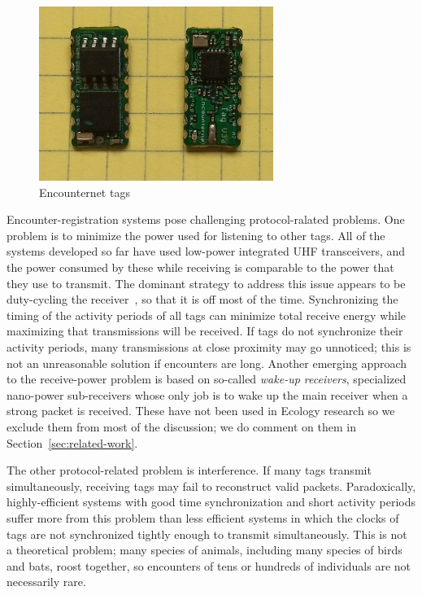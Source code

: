 \begin{figure}[!t]
    \centering
    \includegraphics[width=3in]{figures/tag}
    \caption{Encounternet tags}
    \label{tags}
\end{figure}

Encounter-registration systems pose challenging protocol-ralated problems. One problem is to minimize
the power used for listening to other tags. All of the systems developed so far have used low-power integrated
UHF transceivers, and the power consumed by these while receiving is comparable to the power that they use
to transmit. The dominant strategy to address this issue appears to be duty-cycling the 
receiver~\cite{Zhang2017Performance}, so that it is
off most of the time. Synchronizing the timing of the activity periods of all tags can minimize total receive energy
while maximizing that transmissions will be received. If tags do not synchronize their activity periods, many transmissions
at close proximity may go unnoticed; this is not an unreasonable solution if encounters are long. Another emerging approach
to the receive-power problem is based on so-called {\em wake-up receivers}, specialized nano-power sub-receivers whose only
job is to wake up the main receiver when a strong packet is received. These have not been used in Ecology research so we
exclude them from most of the discussion; we do comment on them in Section~\ref{sec:related-work}.

The other protocol-related problem is interference. 
If many tags transmit simultaneously, receiving tags may fail
to reconstruct valid packets. Paradoxically, highly-efficient 
systems with good time synchronization and short activity
periods suffer more from this problem than less efficient systems 
in which the clocks of tags are not synchronized tightly
enough to transmit simultaneously. This is not a theoretical problem; 
many species of animals, including many species of
birds and bats, roost together, so encounters of tens or hundreds 
of individuals are not necessarily rare.

